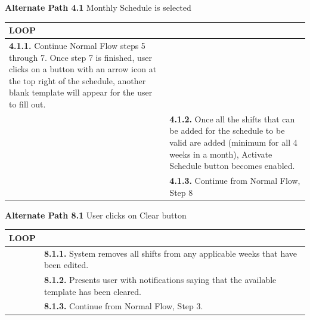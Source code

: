 \documentclass[letterpaper,12pt]{report}
\begin{document}
{\pagebreak
\centering \textbf{Alternate Path 4.1}
\linebreak Monthly Schedule is selected
\begin{center}
\xuchead
\begin{tabular}{| p{8.5cm} | p{8.5cm} |}
\hline
\textbf{LOOP} & \\
\hline
\textbf{4.1.1.} Continue Normal Flow steps 5 through 7. Once step 7 is finished, user clicks on a button with an arrow icon at the top right of the schedule, another blank template will appear for the user to fill out. & \\
\hline
& \textbf{4.1.2.} Once all the shifts that can be added for the schedule to be valid are added (minimum for all 4 weeks in a month), Activate Schedule button becomes enabled.\\
\hline
& \textbf{4.1.3.} Continue from Normal Flow, Step 8 \\
\hline
\end{tabular}
\end{center}

\centering \textbf{Alternate Path 8.1}
\linebreak User clicks on Clear button
\begin{center}
\xuchead
\begin{tabular}{| p{8.5cm} | p{8.5cm} |}
\hline
\textbf{LOOP} & \\
\hline
& \textbf{8.1.1.} System\index{system} removes all shifts from any applicable weeks that have been edited. \\
\hline
& \textbf{8.1.2.} Presents user with notifications saying that the available template has been cleared. \\
\hline
& \textbf{8.1.3.} Continue from Normal Flow, Step 3. \\
\hline
\end{tabular}
\end{center}

}

\pagebreak
\end{document}
